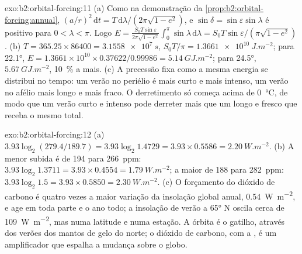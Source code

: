 \begin{solution}{exo:b2:orbital-forcing:11}
(a) Como na demonstração da \cref{prop:b2:orbital-forcing:annual}, $(a/r)^2\,\mathrm dt =
T\,\mathrm d\lambda/(2\pi\sqrt{1 - e^2})$, e $\sin\delta = \sin\varepsilon\sin\lambda$ é positivo
para $0 < \lambda < \pi$. Logo $E = \frac{S_0T\sin\varepsilon}{2\pi\sqrt{1 - e^2}}\int_0^{\pi}\sin\lambda
\,\mathrm d\lambda = S_0T\sin\varepsilon/(\pi\sqrt{1 - e^2})$. (b) $T = 365.25 \times 86400 =
\qty{3.1558e7}{s}$, $S_0T/\pi = \qty{1.3661e10}{J.m^{-2}}$; para \ang{22.1}, $E = 1.3661 \times 10^{10}
\times 0.37622/0.99986 = \qty{5.14}{GJ.m^{-2}}$; para \ang{24.5}, $\qty{5.67}{GJ.m^{-2}}$,
\qty{10}{\percent} a mais. (c) A precessão fixa como a mesma energia se distribui no tempo: um verão
no periélio é mais curto e mais intenso, um verão no afélio mais longo e mais fraco. O derretimento só começa
acima de \qty{0}{\celsius}, de modo que um verão curto e intenso pode derreter mais que um longo e fresco
que receba o mesmo total.
\end{solution}

\begin{solution}{exo:b2:orbital-forcing:12}
(a) $3.93\log_2(279.4/189.7) = 3.93\log_2 1.4729 = 3.93 \times 0.5586 = \qty{2.20}{W.m^{-2}}$. (b) A
menor subida é de 194 para \qty{266}{ppm}: $3.93\log_2 1.3711 = 3.93 \times 0.4554 =
\qty{1.79}{W.m^{-2}}$; a maior de 188 para \qty{282}{ppm}: $3.93\log_2 1.5 = 3.93 \times 0.5850 =
\qty{2.30}{W.m^{-2}}$. (c) O forçamento do dióxido de carbono é quatro vezes a maior variação da
insolação global anual, \qty{0.54}{W.m^{-2}}, e age em toda parte e o ano todo; a insolação de verão
a \ang{65} N oscila cerca de \qty{109}{W.m^{-2}}, mas numa latitude e numa estação. A
órbita é o gatilho, através dos verões dos mantos de gelo do norte; o dióxido de carbono, com a
, é um amplificador que espalha a mudança sobre o globo.
\end{solution}

